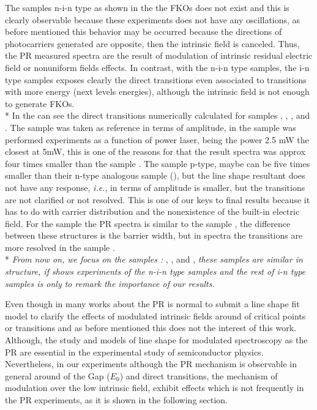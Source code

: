 The samples n-i-n type as shown in the  the FKOs does not exist and this is clearly observable because these experiments does not have any oscillations, as before mentioned this behavior may be occurred because the directions  of photocarriers generated are opposite, then the intrinsic field is canceled. Thus, the PR measured spectra are the result of modulation of intrinsic residual electric field or  nonuniform fields effects\cite{delsole1978effect}.  
In contrast,  with the n-i-n type samples, the i-n type samples exposes clearly the direct transitions even associated to transitions with more energy (next levels energies), although the intrinsic field is not enough to generate FKOs. \\*
In the  can see the direct transitions numerically calculated for samples , , ,  and . The sample  was taken as reference in terms of amplitude, in the sample  was performed experiments as a function of power laser, being the power 2.5 mW the closest at 5mW, this is one of the reasons for that the result spectra was approx four times smaller than the sample .   The sample  p-type, maybe can be five times smaller than their n-type analogous sample (), but the line shape resultant does not have any response, \textit{i.e.}, in terms of amplitude is smaller, but the transitions are not clarified or not resolved. This is one of our keys to final results because it has to do with carrier distribution and the nonexistence of the built-in electric field. For the sample  the PR spectra is similar to the sample  , the difference between these structures is the barrier width, but in spectra the transitions are more resolved in the sample .  \\*
\emph{From now on, we focus on the samples :} , ,  and , \emph{these samples are similar in structure, if shows experiments of the n-i-n type samples and the rest of i-n type samples is only to remark the importance of our results. }

Even though in many works about the PR is normal to submit a line shape fit model  to clarify the effects of modulated intrinsic fields around of critical points or transitions and as before mentioned this does not the interest of this work. Although, the study and models of line shape for modulated spectroscopy as the PR are essential in the experimental study of semiconductor physics\cite{cardona1969modulation,seraphin1966bandstructure}.  Nevertheless, in our experiments  although the PR mechanism is observable in general around of the Gap ($E_0$) and direct transitions, the mechanism of modulation over the low intrinsic field, exhibit  effects  which is not frequently in the PR experiments, as it is shown in the following section. 


